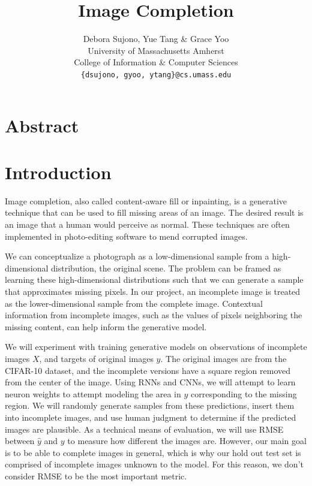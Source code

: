 \documentclass[10pt,twocolumn,letterpaper]{article}
\begin{document}
\title{Image Completion}

\author{Debora Sujono, Yue Tang \& Grace Yoo \\ 
University of Massachusetts Amherst \\ 
College of Information \& Computer Sciences \\
{\tt\small \{dsujono, gyoo, ytang\}@cs.umass.edu} \\
}

\maketitle

\section{Abstract} 


\section{Introduction}
Image completion, also called content-aware fill or inpainting, is a generative technique that can be used to fill missing areas of an image. The desired result is an image that a human would perceive as normal. These techniques are often implemented in photo-editing software to mend corrupted images.

\par We can conceptualize a photograph as a low-dimensional sample from a high-dimensional distribution, the original scene. The problem can be framed as learning these high-dimensional distributions such that we can generate a sample that approximates missing pixels. In our project, an incomplete image is treated as the lower-dimensional sample from the complete image. Contextual information from incomplete images, such as the values of pixels neighboring the missing content, can help inform the generative model. \\

\par 
We will experiment with training generative models on observations of incomplete images $X$, and targets of original images $y$. The original images are from the CIFAR-10 dataset, and the incomplete versions have a square region removed from the center of the image. Using RNNs and CNNs, we will attempt to learn neuron weights to attempt modeling the area in $y$ corresponding to the missing region. We will randomly generate samples from these predictions, insert them into incomplete images, and use human judgment to determine if the predicted images are plausible. As a technical means of evaluation, we will use RMSE between $\hat y$ and $y$ to measure how different the images are. However, our main goal is to be able to complete images in general, which is why our hold out test set is comprised of incomplete images unknown to the model. For this reason, we don't consider RMSE to be the most important metric.\\
\end{document}
